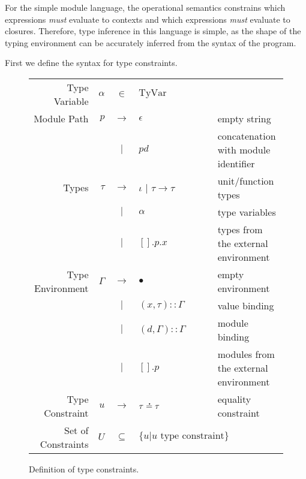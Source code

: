 \documentclass{article}
\theoremstyle{definition}
\newcommand*{\vbar}{|}
\newcommand*{\cons}{::}
\newcommand*{\A}[1]{\overset{\,_{\mbox{\Large .}}}{#1}}
\newcommand*{\modid}{d}
\newcommand*{\TyVar}{\text{TyVar}}
\begin{document}
For the simple module language, the operational semantics constrains which expressions \emph{must} evaluate to contexts and which expressions \emph{must} evaluate to closures.
Therefore, type inference in this language is simple, as the shape of the typing environment can be accurately inferred from the syntax of the program.

First we define the syntax for type constraints.
\begin{figure}[h!]
	\centering
	\begin{tabular}{rrcll}
		Type Variable      & $\alpha$ & $\in$         & $\TyVar$                                                                 \\
		Module Path        & $p$      & $\rightarrow$ & $\epsilon$                       & empty string                          \\
		                   &          & $\vbar$       & $p\modid$                        & concatenation with module identifier  \\
		Types              & $\tau$   & $\rightarrow$ & $\iota$ | $\tau\rightarrow\tau$  & unit/function types                   \\
		                   &          & $\vbar$       & $\alpha$                         & type variables                        \\
		                   &          & $\vbar$       & $[].p.x$                         & types from the external environment   \\
		Type Environment   & $\Gamma$ & $\rightarrow$ & $\bullet$                        & empty environment                     \\
		                   &          & $\vbar$       & $(x,\tau)\cons \Gamma$           & value binding                         \\
		                   &          & $\vbar$       & $(\modid,\Gamma)\cons \Gamma$    & module binding                        \\
		                   &          & $\vbar$       & $[].p$                           & modules from the external environment \\
		Type Constraint    & $u$      & $\rightarrow$ & $\tau\A{=}\tau$                  & equality constraint                   \\
		Set of Constraints & $U$      & $\subseteq$   & $\{u|u\text{ type constraint}\}$
	\end{tabular}
	\caption{Definition of type constraints.}
	\label{fig:typeqdom}
\end{figure}
\end{document}
